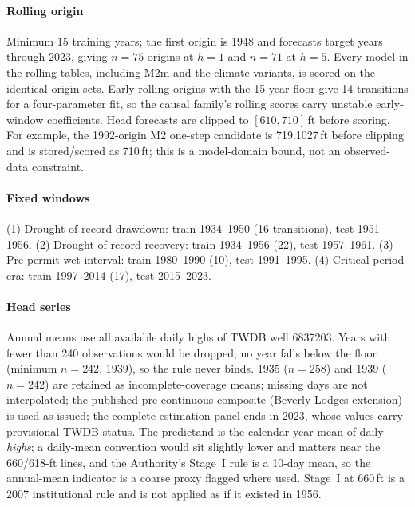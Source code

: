 \documentclass[preprint,11pt,authoryear]{elsarticle}
\theoremstyle{remark}
\begin{document}
\paragraph{Rolling origin} Minimum 15 training years; the first origin is 1948 and forecasts target years through 2023, giving $n=75$ origins at $h=1$ and $n=71$ at $h=5$. Every model in the rolling tables, including M2m and the climate variants, is scored on the identical origin sets. Early rolling origins with the 15-year floor give 14 transitions for a four-parameter fit, so the causal family's rolling scores carry unstable early-window coefficients. Head forecasts are clipped to $[610,710]$\,ft before scoring. For example, the 1992-origin M2 one-step candidate is 719.1027\,ft before clipping and is stored/scored as 710\,ft; this is a model-domain bound, not an observed-data constraint.

\paragraph{Fixed windows} (1) Drought-of-record drawdown: train 1934--1950 (16 transitions), test 1951--1956. (2) Drought-of-record recovery: train 1934--1956 (22), test 1957--1961. (3) Pre-permit wet interval: train 1980--1990 (10), test 1991--1995. (4) Critical-period era: train 1997--2014 (17), test 2015--2023.

\paragraph{Head series} Annual means use all available daily highs of TWDB well 6837203. Years with fewer than 240 observations would be dropped; no year falls below the floor (minimum $n=242$, 1939), so the rule never binds. 1935 ($n=258$) and 1939 ($n=242$) are retained as incomplete-coverage means; missing days are not interpolated; the published pre-continuous composite (Beverly Lodges extension) is used as issued; the complete estimation panel ends in 2023, whose values carry provisional TWDB status. The predictand is the calendar-year mean of daily \emph{highs}; a daily-mean convention would sit slightly lower and matters near the 660/618-ft lines, and the Authority's Stage~I rule is a 10-day mean, so the annual-mean indicator is a coarse proxy flagged where used. Stage~I at 660\,ft is a 2007 institutional rule and is not applied as if it existed in 1956.
\end{document}

